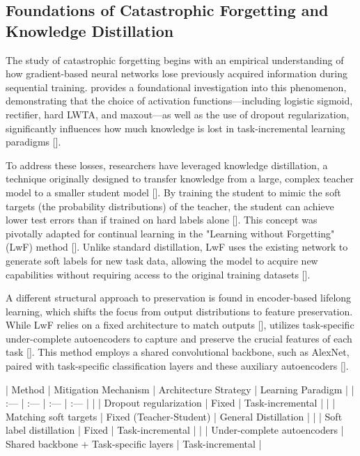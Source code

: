\documentclass[11pt]{article}
\begin{document}
\subsection{Foundations of Catastrophic Forgetting and Knowledge Distillation}

The study of catastrophic forgetting begins with an empirical understanding of how gradient-based neural networks lose previously acquired information during sequential training. \citep{1312.6211} provides a foundational investigation into this phenomenon, demonstrating that the choice of activation functions—including logistic sigmoid, rectifier, hard LWTA, and maxout—as well as the use of dropout regularization, significantly influences how much knowledge is lost in task-incremental learning paradigms [\citep{1312.6211}].

To address these losses, researchers have leveraged knowledge distillation, a technique originally designed to transfer knowledge from a large, complex teacher model to a smaller student model [\citep{1503.02531}]. By training the student to mimic the soft targets (the probability distributions) of the teacher, the student can achieve lower test errors than if trained on hard labels alone [\citep{1503.02531}]. This concept was pivotally adapted for continual learning in the "Learning without Forgetting" (LwF) method [\citep{1606.09282}]. Unlike standard distillation, LwF uses the existing network to generate soft labels for new task data, allowing the model to acquire new capabilities without requiring access to the original training datasets [\citep{1606.09282}].

A different structural approach to preservation is found in encoder-based lifelong learning, which shifts the focus from output distributions to feature preservation. While LwF relies on a fixed architecture to match outputs [\citep{1606.09282}], \citep{1704.01920} utilizes task-specific under-complete autoencoders to capture and preserve the crucial features of each task [\citep{1704.01920}]. This method employs a shared convolutional backbone, such as AlexNet, paired with task-specific classification layers and these auxiliary autoencoders [\citep{1704.01920}].

| Method | Mitigation Mechanism | Architecture Strategy | Learning Paradigm |
| :--- | :--- | :--- | :--- |
| \citep{1312.6211} | Dropout regularization | Fixed | Task-incremental |
| \citep{1503.02531} | Matching soft targets | Fixed (Teacher-Student) | General Distillation |
| \citep{1606.09282} | Soft label distillation | Fixed | Task-incremental |
| \citep{1704.01920} | Under-complete autoencoders | Shared backbone + Task-specific layers | Task-incremental |
\end{document}
